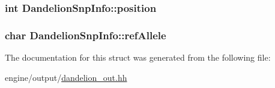 \label{structDandelionSnpInfo_aaf39c2953bf283cb8684110114aee7b7}
\hypertarget{structDandelionSnpInfo_a4aaf965cd75aaca6d80a14b2e9a3e0be}{
\subsubsection[{position}]{\setlength{\rightskip}{0pt plus 5cm}int {\bf DandelionSnpInfo::position}}}
\label{structDandelionSnpInfo_a4aaf965cd75aaca6d80a14b2e9a3e0be}
\hypertarget{structDandelionSnpInfo_a9d8144ecc88436ada470a03fe77bb487}{
\subsubsection[{refAllele}]{\setlength{\rightskip}{0pt plus 5cm}char {\bf DandelionSnpInfo::refAllele}}}
\label{structDandelionSnpInfo_a9d8144ecc88436ada470a03fe77bb487}


The documentation for this struct was generated from the following file:\begin{DoxyCompactItemize}
\item 
engine/output/\hyperlink{dandelion__out_8hh}{dandelion\_\-out.hh}\end{DoxyCompactItemize}
